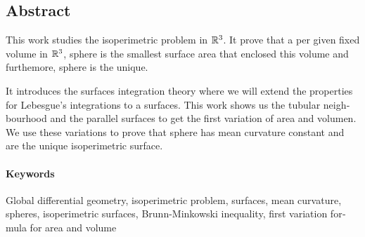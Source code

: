 \begin{otherlanguage}{american}
\section{Abstract}

This work studies the isoperimetric problem in $\mathbb{R}^3$. It prove that a  per given fixed volume in $\mathbb{R}^3$, sphere is the smallest surface area that enclosed this volume and furthemore, sphere is the unique. 

It introduces the surfaces integration theory where we will extend the properties for Lebesgue's integrations to a surfaces. This work shows us the tubular neighbourhood and the parallel surfaces to get the first variation of area and volumen. We use these variations to prove that sphere has mean curvature constant and are the unique isoperimetric surface.


\paragraph{Keywords} Global differential geometry, isoperimetric problem, surfaces, mean curvature, spheres, isoperimetric surfaces, Brunn-Minkowski inequality, first variation formula for area and volume

\end{otherlanguage}

\newpage
